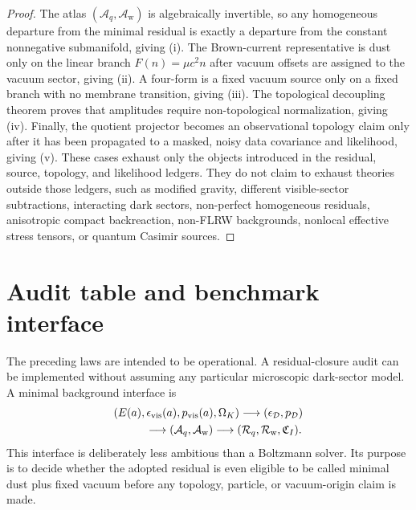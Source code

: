 \documentclass[
  aps,
  prd,
  reprint,
  superscriptaddress,
  floatfix,
  nofootinbib,
  longbibliography
]{revtex4-2}
\theoremstyle{plain}
\theoremstyle{definition}
\theoremstyle{remark}
\newcommand{\D}{\mathcal D}
\newcommand{\vis}{\mathrm{vis}}
\newcommand{\wind}{\mathrm w}
\newcommand{\Aq}{\mathcal A_q}
\newcommand{\Aw}{\mathcal A_{\mathrm w}}
\newcommand{\Rcl}{\mathcal R}
\newcommand{\eps}{\epsilon}
\begin{document}
\begin{proof}
The atlas \((\Aq,\Aw)\) is algebraically invertible, so any homogeneous
departure from the minimal residual is exactly a departure from the constant
nonnegative submanifold, giving (i).  The Brown-current representative is dust
only on the linear branch \(F(n)=\mu c^2n\) after vacuum offsets are assigned to
the vacuum sector, giving (ii).  A four-form is a fixed vacuum source only on a
fixed branch with no membrane transition, giving (iii).  The topological
decoupling theorem proves that amplitudes require non-topological
normalization, giving (iv).  Finally, the quotient projector becomes an
observational topology claim only after it has been propagated to a masked,
noisy data covariance and likelihood, giving (v).  These cases exhaust only the
objects introduced in the residual, source, topology, and likelihood ledgers.
They do not claim to exhaust theories outside those ledgers, such as modified
gravity, different visible-sector subtractions, interacting dark sectors,
non-perfect homogeneous residuals, anisotropic compact backreaction, non-FLRW
backgrounds, nonlocal effective stress tensors, or quantum Casimir sources.
\end{proof}


\section{Audit table and benchmark interface}

The preceding laws are intended to be operational.  A residual-closure audit can
be implemented without assuming any particular microscopic dark-sector model.  A
minimal background interface is
\begin{equation}
\begin{aligned}
&(E(a),\eps_{\vis}(a),p_{\vis}(a),\Omega_K)
\longrightarrow
(\eps_\D,p_\D)
\\
&\hspace{1.0cm}\longrightarrow
(\Aq,\Aw)
\longrightarrow
(\Rcl_q,\Rcl_{\wind},\mathfrak C_I).
\end{aligned}
\label{eq:standard_code_interface}
\end{equation}
This interface is deliberately less ambitious than a Boltzmann solver.  Its
purpose is to decide whether the adopted residual is even eligible to be called
minimal dust plus fixed vacuum before any topology, particle, or vacuum-origin
claim is made.
\end{document}
